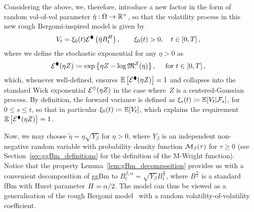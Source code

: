 Considering the above, we, therefore, introduce a new factor in the form of random vol-of-vol parameter $\tilde\eta:\Omega\rightarrow \mathbb{R}^+$, so that the volatility process in this new rough Bergomi-inspired model is given by
\[
V_t = \xi_0(t) \mathcal{E}^\blacklozenge\left(\tilde\eta B_t^{H}\right), \qquad \xi_0(t)>0, \quad t\in[0,T]\,,
\]
where we define the stochastic exponential for any $\eta>0$ as
\begin{equation}
    \mathcal{E}^\blacklozenge(\eta Z) \coloneqq \exp\left\{\eta Z - \log\mathfrak{M}^Z_{\cdot}(\eta)\right\}, \quad \textup{ for }  t\in[0,T]\,,
\end{equation}
which, whenever well-defined, ensures $\mathbb{E}\left[\mathcal{E}^\blacklozenge(\eta Z)\right] = 1$ and collapses into the standard Wick exponential $\mathcal{E}^\lozenge(\eta Z)$ in the case where~$Z$ is a centered-Gaussian process. 
By definition, the forward variance is defined as $\xi_{s}(t) \coloneqq \mathbb{E}[V_t | \mathcal{F}_{s}]$, for $0\leq s\leq t$, so that in particular
$\xi_{0}(t) \coloneqq \mathbb{E}[V_t]$, which explains the requirement $\mathbb{E}\left[\mathcal{E}^\blacklozenge(\eta Z)\right] = 1$.

Now, we may choose $\tilde\eta = \eta\sqrt{Y_\beta}$ for $\eta>0$, where $Y_\beta$ is an independent non-negative random variable with probability density function $\mathcal{M}_{\beta}(\tau)$ for $\tau \geq 0$ (see Section~\ref{sec:ggBm_definitions} for the definition of the M-Wright function). Notice that the property Lemma~\ref{lem:gBm_decomposition} provides us with a convenient decomposition of ggBm to $B^{\beta, \alpha}_t = \sqrt{Y_\beta} B^{\frac\alpha2}_t$, where $B^{\frac\alpha2}$ is a standard fBm with Hurst parameter $H=\nobreak\alpha / 2$. The model can thus be viewed as a generalisation of the rough Bergomi model~\cite{Bayer2015PricingVolatility} with a random volatility-of-volatility coefficient.

